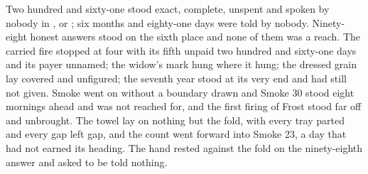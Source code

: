 Two hundred and sixty-one stood exact, complete, unspent and spoken by nobody in ,  or ; six months and eighty-one days were told by nobody. Ninety-eight honest answers stood on the sixth place and none of them was a reach. The carried fire stopped at four with its fifth unpaid two hundred and sixty-one days and its payer unnamed; the widow's mark hung where it hung; the dressed grain lay covered and unfigured; the seventh year stood at its very end and had still not given. Smoke went on without a boundary drawn and Smoke 30 stood eight mornings ahead and was not reached for, and the first firing of Frost stood far off and unbrought. The towel lay on nothing but the fold, with every tray parted and every gap left gap, and the count went forward into Smoke 23, a day that had not earned its heading. The hand rested against the fold on the ninety-eighth answer and asked to be told nothing.
